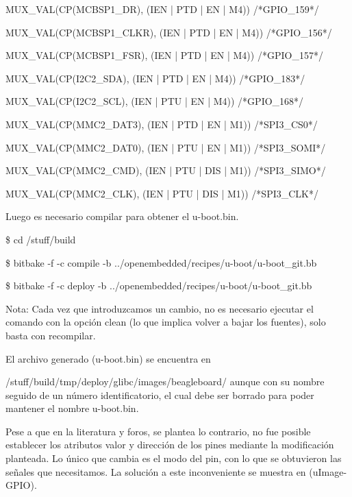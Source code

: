 MUX\_VAL(CP(MCBSP1\_DR),	(IEN  | PTD | EN  | M4)) /*GPIO\_159*/\ 

MUX\_VAL(CP(MCBSP1\_CLKR),	(IEN  | PTD | EN  | M4)) /*GPIO\_156*/\ 

MUX\_VAL(CP(MCBSP1\_FSR),	(IEN  | PTD | EN  | M4)) /*GPIO\_157*/\ 

MUX\_VAL(CP(I2C2\_SDA),		(IEN  | PTD | EN  | M4)) /*GPIO\_183*/\ 

MUX\_VAL(CP(I2C2\_SCL),		(IEN  | PTU | EN  | M4)) /*GPIO\_168*/\ 

MUX\_VAL(CP(MMC2\_DAT3),	(IEN  | PTD | EN  | M1)) /*SPI3\_CS0*/\ 

MUX\_VAL(CP(MMC2\_DAT0),	(IEN  | PTU | EN  | M1)) /*SPI3\_SOMI*/\ 

MUX\_VAL(CP(MMC2\_CMD),		(IEN  | PTU | DIS | M1)) /*SPI3\_SIMO*/\ 

MUX\_VAL(CP(MMC2\_CLK),		(IEN  | PTU | DIS | M1)) /*SPI3\_CLK*/


Luego es necesario compilar para obtener el u-boot.bin.

\$ cd /stuff/build

\$ bitbake -f -c compile -b ../openembedded/recipes/u-boot/u-boot\_git.bb

\$ bitbake -f -c deploy -b ../openembedded/recipes/u-boot/u-boot\_git.bb


Nota: Cada vez que introduzcamos un cambio, no es necesario ejecutar el comando con la opción clean (lo que implica volver a bajar los fuentes), solo basta con recompilar.

El archivo generado (u-boot.bin) se encuentra en 

/stuff/build/tmp/deploy/glibc/images/beagleboard/ aunque con su nombre seguido de un número identificatorio, el cual debe ser borrado para poder mantener el nombre u-boot.bin.

Pese a que en la literatura y foros, se plantea lo contrario, no fue posible establecer los atributos valor y dirección de los pines mediante la modificación planteada. Lo único que cambia es el modo del pin, con lo que se obtuvieron las señales que necesitamos. La solución a este inconveniente se muestra en (uImage-GPIO).



